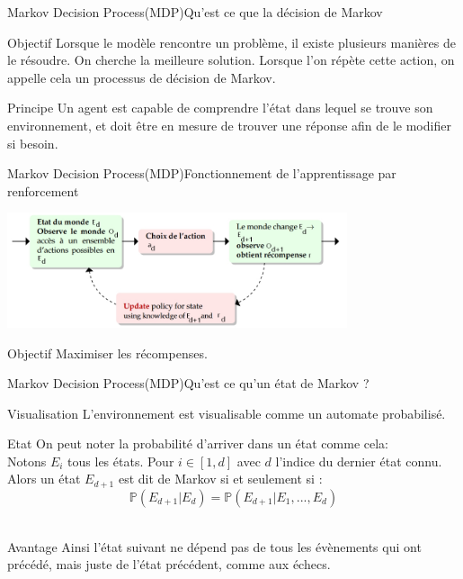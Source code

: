 
\begin{frame}{Markov Decision Process(MDP)}{Qu'est ce que la décision de Markov}
	\begin{center}
		\begin{block}{Objectif}
			Lorsque le modèle rencontre un problème, il existe plusieurs manières de le résoudre. On cherche la meilleure solution. Lorsque l'on répète cette action, on appelle cela un processus de décision de Markov. 
		\end{block}
		\begin{block}{Principe}
			Un agent est capable de comprendre l’état dans lequel se trouve son environnement, et doit être en mesure de trouver une réponse afin de le modifier si besoin.
		\end{block}
	\end{center}
\end{frame}
\begin{frame}{Markov Decision Process(MDP)}{Fonctionnement de l'apprentissage par renforcement}
	\begin{center}
		\includegraphics[width=10cm]{ressources/MDP/Fonctionnement.jpg}
	\end{center}
	\begin{block}{Objectif}
		Maximiser les récompenses.
	\end{block}
\end{frame}
\begin{frame}{Markov Decision Process(MDP)}{Qu'est ce qu'un état de Markov ?}
	\begin{center}
		
		\begin{block}{Visualisation}
			L'environnement est visualisable comme un automate probabilisé.
		\end{block}
		\begin{block}{Etat}
			On peut noter la probabilité d'arriver dans un état comme cela:\\
			Notons $E_{i}$ tous les états. Pour $i \in [1,d]$ avec $d$ l'indice du dernier état connu.\\
			Alors un état $E_{d+1}$ est dit de Markov si et seulement si :\\ 
			$$\mathbb{P}(E_{d+1} | E_{d}) = \mathbb{P}(E_{d+1} | E_{1}, ..., E_{d})$$\\
		\end{block}
		\begin{block}{Avantage}
			Ainsi l'état suivant ne dépend pas de tous les évènements qui ont précédé, mais juste de l'état précédent, comme aux échecs.
		\end{block}
	\end{center}
\end{frame}
